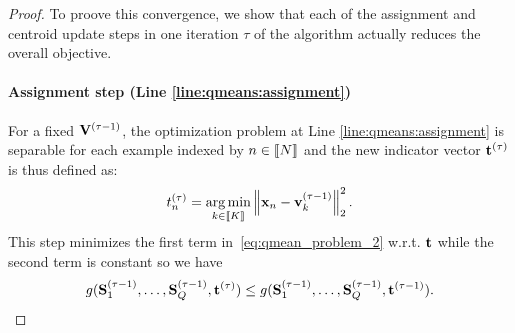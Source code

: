 
\begin{proof}
To proove this convergence, we show that each of the assignment and centroid update steps in one iteration $\tau$ of the algorithm actually reduces the overall objective. 





\paragraph{Assignment step (Line \ref{line:qmeans:assignment})} For a fixed ${\mathbf{V}}^{(\tau-1)}$, the optimization problem at Line \ref{line:qmeans:assignment} is separable for each example indexed by $n \in \left \llbracket N\right \rrbracket$ and the new indicator vector ${\mathbf{t}}^{(\tau)}$ is thus defined as:
%
\begin{align}
\label{eq:qmean_problem_U_fixed}
 t^{(\tau)}_n = \operatorname*{arg\,min}_{k \in \left \llbracket K\right \rrbracket} \left \| {\mathbf{x}}_n - {\mathbf{v}}_k^{(\tau-1)}\right \|_2^2.
\end{align}
%
This step minimizes the first term in~\eqref{eq:qmean_problem_2} w.r.t. ${\mathbf{t}}$ while the second term is constant so we have 
\begin{align*}
g({\mathbf{S}}_1^{(\tau-1)}, \ldots,{\mathbf{S}}_Q^{(\tau-1)}, {\mathbf{t}}^{(\tau)}) \leq g({\mathbf{S}}_1^{(\tau-1)}, \ldots,{\mathbf{S}}_Q^{(\tau-1)}, {\mathbf{t}}^{(\tau-1)}).
\end{align*}


\end{proof}
